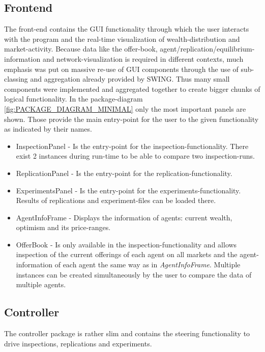 \documentclass[Bachelorarbeit.tex]{subfiles}
\begin{document}
\subsection{Frontend}
The front-end contains the GUI functionality through which the user interacts with the program and the real-time visualization of wealth-distribution and market-activity. Because data like the offer-book, agent/replication/equilibrium-information and network-visualization is required in different contexts, much emphasis was put on massive re-use of GUI components through the use of sub-classing and aggregation already provided by SWING. Thus many small components were implemented and aggregated together to create bigger chunks of logical functionality. In the package-diagram \ref{fig:PACKAGE_DIAGRAM_MINIMAL} only the most important panels are shown. Those provide the main entry-point for the user to the given functionality as indicated by their names.

\begin{itemize}
\item InspectionPanel - Is the entry-point for the inspection-functionality. There exist 2 instances during run-time to be able to compare two inspection-runs.
\item ReplicationPanel - Is the entry-point for the replication-functionality.
\item ExperimentsPanel - Is the entry-point for the experiments-functionality. Results of replications and experiment-files can be loaded there.
\item AgentInfoFrame - Displays the information of agents: current wealth, optimism and its price-ranges.
\item OfferBook - Is only available in the inspection-functionality and allows inspection of the current offerings of each agent on all markets and the agent-information of each agent the same way as in \textit{AgentInfoFrame}. Multiple instances can be created simultaneously by the user to compare the data of multiple agents.
\end{itemize}

\subsection{Controller}
The controller package is rather slim and contains the steering functionality to drive inspections, replications and experiments. 
\end{document}
